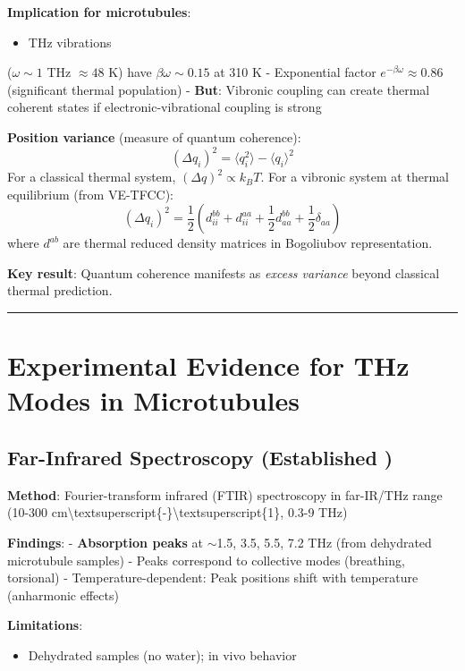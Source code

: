 \textbf{Implication for microtubules}:
\begin{itemize}
\item THz vibrations
\end{itemize}

(\(\omega \sim 1\) THz \(\approx 48\) K) have \(\beta \omega \sim 0.15\)
at 310 K - Exponential factor \(e^{-\beta \omega} \approx 0.86\)
(significant thermal population) - \textbf{But}: Vibronic coupling can
create thermal coherent states if electronic-vibrational coupling is
strong

\textbf{Position variance} (measure of quantum coherence):
\[(\Delta q_i)^2 = \langle q_i^2 \rangle - \langle q_i \rangle^2\] For a
classical thermal system, \((\Delta q)^2 \propto k_B T\). For a vibronic
system at thermal equilibrium (from VE-TFCC):
\[(\Delta q_i)^2 = \frac{1}{2} \left( d_{ii}^{bb} + d_{ii}^{aa} + \frac{1}{2} d_{aa}^{bb} + \frac{1}{2} \delta_{aa} \right)\]
where \(d^{ab}\) are thermal reduced density matrices in Bogoliubov
representation.

\textbf{Key result}: Quantum coherence manifests as \emph{excess
variance} beyond classical thermal prediction.

\begin{center}\rule{0.5\linewidth}{0.5pt}\end{center}

\section{Experimental Evidence for THz Modes in
Microtubules}\label{experimental-evidence-for-thz-modes-in-microtubules}

\subsection{Far-Infrared Spectroscopy (Established
)}\label{far-infrared-spectroscopy-established}

\textbf{Method}: Fourier-transform infrared (FTIR) spectroscopy in
far-IR/THz range (10-300
cm\textbackslash textsuperscript\{-\}\textbackslash textsuperscript\{1\},
0.3-9 THz)

\textbf{Findings}: - \textbf{Absorption peaks} at $\sim$1.5,
3.5, 5.5, 7.2 THz (from dehydrated microtubule samples) - Peaks
correspond to collective modes (breathing, torsional) -
Temperature-dependent: Peak positions shift with temperature (anharmonic
effects)

\textbf{Limitations}:
\begin{itemize}
\item Dehydrated samples (no water); in vivo behavior
\end{itemize}

